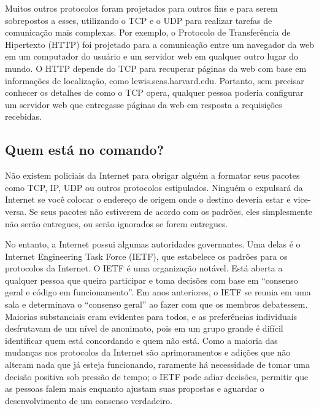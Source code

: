Muitos outros protocolos foram projetados para outros fins e para serem sobrepostos a esses,
utilizando o TCP e o UDP para realizar tarefas de comunicação mais complexas. Por exemplo, o
Protocolo de Transferência de Hipertexto (HTTP) foi projetado para a comunicação entre um
navegador da web em um computador do usuário e um servidor web em qualquer outro lugar do
mundo. O HTTP depende do TCP para recuperar páginas da web com base em informações de
localização, como lewis.seas.harvard.edu. Portanto, sem precisar conhecer os detalhes de como
o TCP opera, qualquer pessoa poderia configurar um servidor web que entregasse páginas da web
em resposta a requisições recebidas.

\subsection{Quem está no comando?}
\label{gatekeepers:quem}

Não existem policiais da Internet para obrigar alguém a formatar seus pacotes como TCP, IP,
UDP ou outros protocolos estipulados. Ninguém o expulsará da Internet se você colocar o
endereço de origem onde o destino deveria estar e vice-versa. Se seus pacotes não estiverem
de acordo com os padrões, eles simplesmente não serão entregues, ou serão ignorados se forem
entregues.

No entanto, a Internet possui algumas autoridades governantes. Uma delas é o Internet
Engineering Task Force (IETF), que estabelece os padrões para os protocolos da Internet. O
IETF é uma organização notável. Está aberta a qualquer pessoa que queira participar e toma
decisões com base em ``consenso geral e código em funcionamento''. Em anos anteriores, o
IETF se reunia em uma sala e determinava o ``consenso geral'' ao fazer com que os membros
debatessem. Maiorias substanciais eram evidentes para todos, e as preferências individuais
desfrutavam de um nível de anonimato, pois em um grupo grande é difícil identificar quem
está concordando e quem não está. Como a maioria das mudanças nos protocolos da Internet são
aprimoramentos e adições que não alteram nada que já esteja funcionando, raramente há
necessidade de tomar uma decisão positiva sob pressão de tempo; o IETF pode adiar decisões,
permitir que as pessoas falem mais enquanto ajustam suas propostas e aguardar o
desenvolvimento de um consenso verdadeiro.


